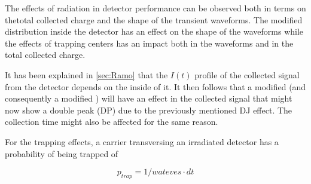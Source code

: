 

The effects of radiation in detector performance can be observed both in terms on thetotal collected charge and the shape of the transient waveforms. The modified \neff distribution inside the detector has an effect on the shape of the waveforms while the effects of trapping centers has an impact both in the waveforms and in the total collected charge.

It has been explained in \ref{sec:Ramo} that the $I(t)$ profile of the collected signal from the detector depends on the  inside of it. It then follows that a modified \neff (and consequently a modified ) will have an effect in the collected signal that might now show a double peak (DP) due to the previously mentioned DJ effect. The collection time might also be affected for the same reason.

For the trapping effects, a carrier transversing an irradiated detector has a probability of being trapped of 

\[p_{trap} = 1/wateves \cdot dt\] %

